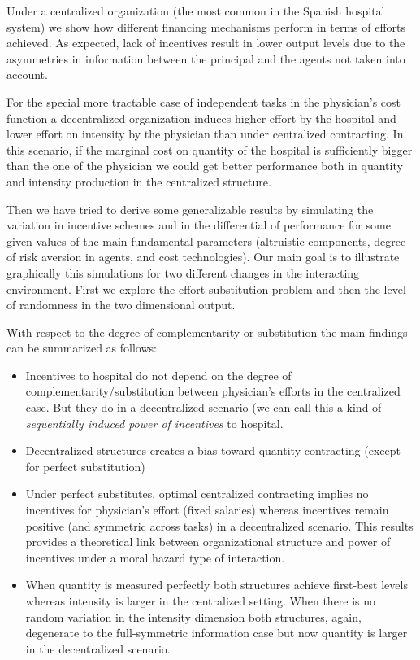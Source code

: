\documentclass[12pt,letterpaper]{article}
\begin{document}
 Under a centralized organization (the most common in the Spanish hospital system) we show how different financing mechanisms  perform in terms of efforts achieved. As expected, lack of incentives result in lower output levels due to the asymmetries in information between the principal and the agents not taken into account.

 For the special more tractable case of independent tasks in the physician's cost function a decentralized organization induces higher effort by the hospital and  lower effort on intensity by the physician than under centralized contracting. In this scenario, if the marginal cost on quantity of the hospital is sufficiently bigger than the one of the physician we could get better performance both in quantity and intensity production in the centralized structure.

 Then we have tried to derive some generalizable results by simulating the variation in incentive schemes and in the differential of performance for some given values of the main fundamental parameters (altruistic components, degree of risk aversion in agents, and cost technologies). Our main goal is to illustrate graphically this simulations for two different changes in the interacting environment. First we explore the effort substitution problem and then the level of randomness in the two dimensional output.

 With respect to the degree of complementarity or substitution the main findings can be summarized as follows:

\begin{itemize}
  \item Incentives to hospital do not depend on the degree of complementarity/substitution between physician's efforts in the centralized case. But they do in a decentralized scenario (we can call this a kind of \emph{sequentially induced power of incentives} to hospital.
  \item Decentralized structures creates a bias toward quantity contracting (except for perfect substitution)
  \item Under perfect substitutes, optimal centralized contracting implies no incentives for physician's effort (fixed  salaries) whereas incentives remain positive (and symmetric across tasks) in a decentralized scenario. This results provides a theoretical link between organizational structure and power of incentives under a moral hazard type of interaction.
  \item When quantity is measured perfectly both structures achieve first-best levels whereas intensity is larger in the centralized setting. When there is no random variation in the intensity dimension both structures, again, degenerate to the full-symmetric information case but now quantity is larger in the decentralized scenario.

\end{itemize}
\end{document}
